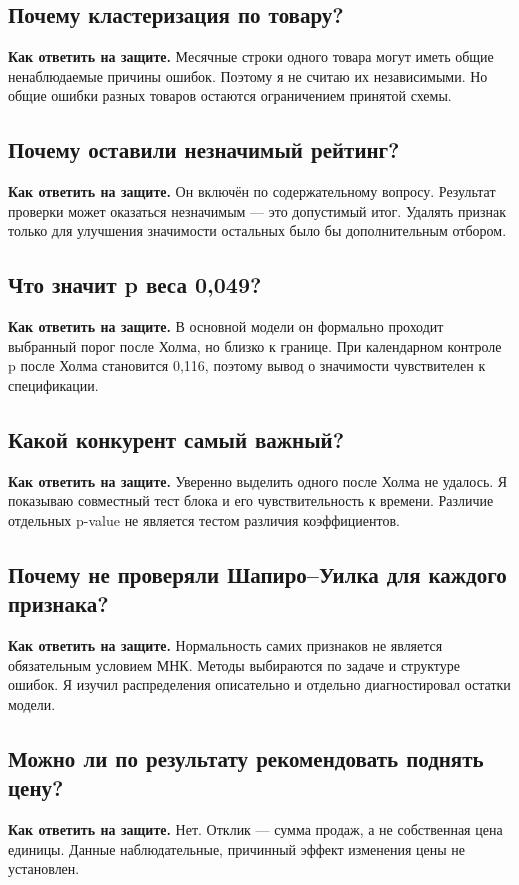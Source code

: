 \documentclass[12pt,a4paper]{article}
\newcommand{\answer}[1]{\par\textbf{Как ответить на защите.} #1\par}
\begin{document}
\subsection*{Почему кластеризация по товару?}
\answer{Месячные строки одного товара могут иметь общие ненаблюдаемые причины ошибок. Поэтому я не считаю их независимыми. Но общие ошибки разных товаров остаются ограничением принятой схемы.}

\subsection*{Почему оставили незначимый рейтинг?}
\answer{Он включён по содержательному вопросу. Результат проверки может оказаться незначимым --- это допустимый итог. Удалять признак только для улучшения значимости остальных было бы дополнительным отбором.}

\subsection*{Что значит p веса 0,049?}
\answer{В основной модели он формально проходит выбранный порог после Холма, но близко к границе. При календарном контроле p после Холма становится 0,116, поэтому вывод о значимости чувствителен к спецификации.}

\subsection*{Какой конкурент самый важный?}
\answer{Уверенно выделить одного после Холма не удалось. Я показываю совместный тест блока и его чувствительность к времени. Различие отдельных p-value не является тестом различия коэффициентов.}

\subsection*{Почему не проверяли Шапиро--Уилка для каждого признака?}
\answer{Нормальность самих признаков не является обязательным условием МНК. Методы выбираются по задаче и структуре ошибок. Я изучил распределения описательно и отдельно диагностировал остатки модели.}

\subsection*{Можно ли по результату рекомендовать поднять цену?}
\answer{Нет. Отклик --- сумма продаж, а не собственная цена единицы. Данные наблюдательные, причинный эффект изменения цены не установлен.}
\end{document}
